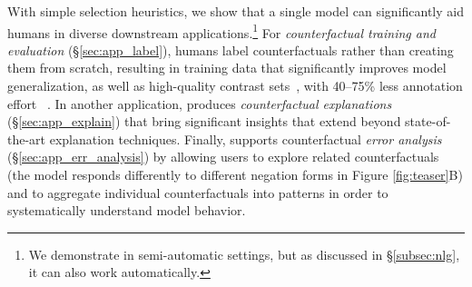 
With simple selection heuristics, we show that a single \sysname model can significantly aid humans in diverse downstream applications.\footnote{We demonstrate \sysname in semi-automatic settings, but as discussed in \S\ref{subsec:nlg}, it can also work automatically.} 
For \emph{counterfactual training and evaluation} (\S\ref{sec:app_label}), humans label \sysname counterfactuals rather than creating them from scratch, resulting in training data that significantly improves model generalization, as well as high-quality contrast sets~\cite{gardner2020contrast}, with 40--75\% less annotation effort ~\cite{kaushik2019learning}. 
In another application, \sysname produces \emph{counterfactual explanations} (\S\ref{sec:app_explain}) that bring significant insights that extend beyond state-of-the-art explanation techniques. 
Finally, \sysname supports counterfactual \emph{error analysis} (\S\ref{sec:app_err_analysis}) by allowing users to explore related counterfactuals (\eg the model responds differently to different negation forms in Figure \ref{fig:teaser}B) and to aggregate individual counterfactuals into patterns in order to systematically understand model behavior.



